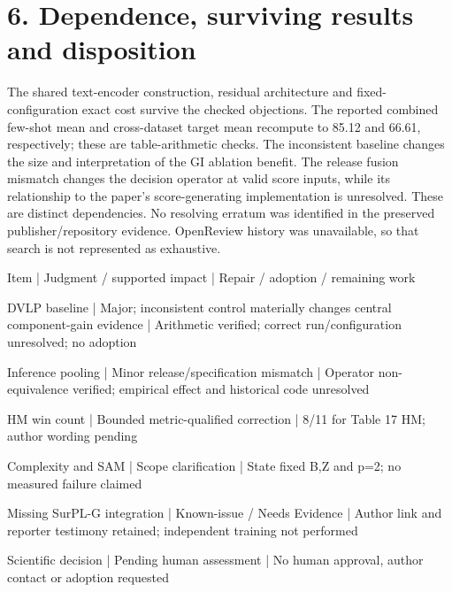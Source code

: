 \documentclass[10pt]{article}
\begin{document}
\section*{6. Dependence, surviving results and disposition}
The shared text-encoder construction, residual architecture and fixed-configuration exact cost survive the checked objections. The reported combined few-shot mean and cross-dataset target mean recompute to 85.12 and 66.61, respectively; these are table-arithmetic checks. The inconsistent baseline changes the size and interpretation of the GI ablation benefit. The release fusion mismatch changes the decision operator at valid score inputs, while its relationship to the paper’s score-generating implementation is unresolved. These are distinct dependencies. No resolving erratum was identified in the preserved publisher/repository evidence. OpenReview history was unavailable, so that search is not represented as exhaustive.\par
Item | Judgment / supported impact | Repair / adoption / remaining work\par
DVLP baseline | Major; inconsistent control materially changes central component-gain evidence | Arithmetic verified; correct run/configuration unresolved; no adoption\par
Inference pooling | Minor release/specification mismatch | Operator non-equivalence verified; empirical effect and historical code unresolved\par
HM win count | Bounded metric-qualified correction | 8/11 for Table 17 HM; author wording pending\par
Complexity and SAM | Scope clarification | State fixed B,Z and p=2; no measured failure claimed\par
Missing SurPL-G integration | Known-issue / Needs Evidence | Author link and reporter testimony retained; independent training not performed\par
Scientific decision | Pending human assessment | No human approval, author contact or adoption requested\par
\end{document}
